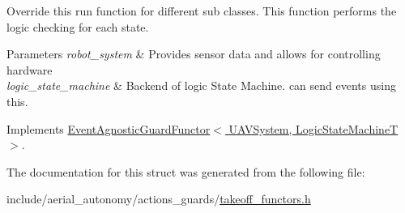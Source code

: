 Override this run function for different sub classes. This function performs the logic checking for each state. 


\begin{DoxyParams}{Parameters}
{\em robot\-\_\-system} & Provides sensor data and allows for controlling hardware \\
\hline
{\em logic\-\_\-state\-\_\-machine} & Backend of logic State Machine. can send events using this. \\
\hline
\end{DoxyParams}


Implements \hyperlink{structEventAgnosticGuardFunctor_ad97196f6a607d199d6dbd56156b8dd8c}{Event\-Agnostic\-Guard\-Functor$<$ U\-A\-V\-System, Logic\-State\-Machine\-T $>$}.



The documentation for this struct was generated from the following file\-:\begin{DoxyCompactItemize}
\item 
include/aerial\-\_\-autonomy/actions\-\_\-guards/\hyperlink{takeoff__functors_8h}{takeoff\-\_\-functors.\-h}\end{DoxyCompactItemize}
